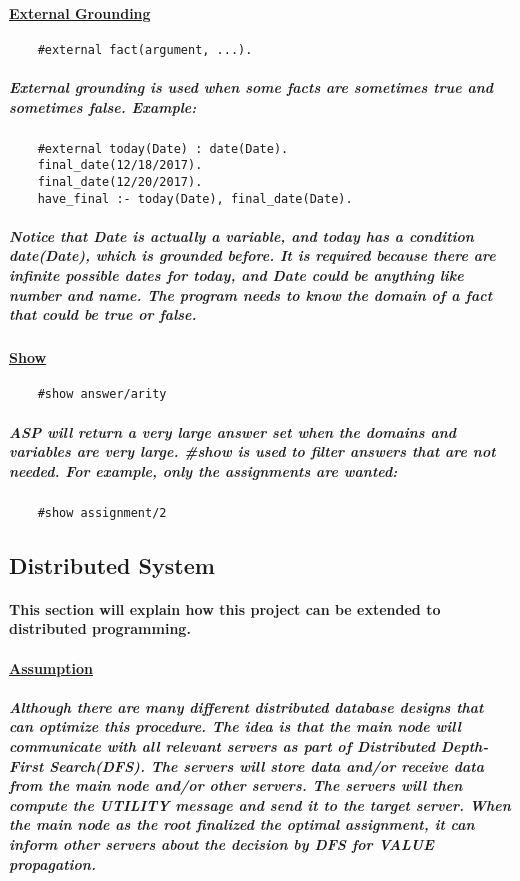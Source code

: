 \documentclass{article}
\begin{document}
	\paragraph{\underline{External Grounding}}
	\begin{verbatim}
	#external fact(argument, ...).
	\end{verbatim}
	\subparagraph{External grounding is used when some facts are sometimes true and sometimes false. Example:}
	\begin{verbatim}
	#external today(Date) : date(Date).
	final_date(12/18/2017).
	final_date(12/20/2017).
	have_final :- today(Date), final_date(Date). 
	\end{verbatim}
	\subparagraph{Notice that Date is actually a variable, and today has a condition date(Date), which is grounded before. It is required because there are infinite possible dates for today, and Date could be anything like number and name. The program needs to know the domain of a fact that could be true or false.}
	\paragraph{\underline{Show}}
	\begin{verbatim}
	#show answer/arity
	\end{verbatim}
	\subparagraph{ASP will return a very large answer set when the domains and variables are very large. \#show is used to filter answers that are not needed. For example, only the assignments are wanted:}
	\begin{verbatim}
	#show assignment/2
	\end{verbatim}
	\subsection{Distributed System}
	\paragraph{This section will explain how this project can be extended to distributed programming.}
	\paragraph{\underline{Assumption}}
	\subparagraph{Although there are many different distributed database designs that can optimize this procedure. The idea is that the main node will communicate with all relevant servers as part of Distributed Depth-First Search(DFS). The servers will store data and/or receive data from the main node and/or other servers. The servers will then compute the UTILITY message and send it to the target server. When the main node as the root finalized the optimal assignment, it can inform other servers about the decision by DFS for VALUE propagation.}
\end{document}
